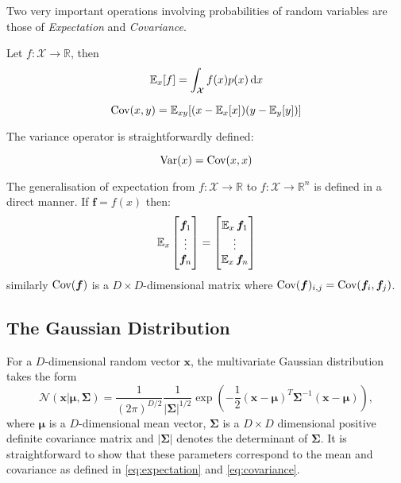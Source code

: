 Two very important operations involving probabilities of random variables are
those of \textit{Expectation} and \textit{Covariance}.
\begin{definition}[Expectation]
  \label{eq:expectation}
  Let $f : \mathcal{X} \to \mathbb{R}$, then
  \begin{equation*}
    \E_x[f] = \int_{\mathcal{X}} f(x) p(x) \dif x
  \end{equation*}
\end{definition}
\begin{definition}[Covariance]
  \label{eq:covariance}
  \begin{equation*}
    \operatorname{\textnormal{Cov}}(x, y) = \operatorname{\mathbb{E}}_{xy}[(x - \operatorname{\mathbb{E}}_x[x])(y - \operatorname{\mathbb{E}}_y[y])]
  \end{equation*}
\end{definition}
The variance operator is straightforwardly defined:
\begin{definition}[Variance]
  \label{eq:variance}
  \begin{equation*}
    \operatorname{\textnormal{Var}}(x) = \operatorname{\textnormal{Cov}}(x, x)
  \end{equation*}
\end{definition}

The generalisation of expectation from $f: \mathcal{X} \to \mathbb{R}$ to $f: \mathcal{X} \to
\mathbb{R}^n$ is defined in a direct manner. If $\bm{f} =
f(x)$ then:
\begin{equation*}
  \operatorname{\mathbb{E}}_x
  \begin{bmatrix}
    \bm{f}_1 \\
    \vdots \\
    \bm{f}_n \\
  \end{bmatrix} =
  \begin{bmatrix}
    \operatorname{\mathbb{E}}_x \bm{f}_1 \\
    \vdots \\
    \operatorname{\mathbb{E}}_x \bm{f}_n \\
  \end{bmatrix}
\end{equation*}
similarly $\operatorname{\textnormal{Cov}}(\bm{f})$ is a $D \times D$-dimensional matrix where
$\operatorname{\textnormal{Cov}}(\bm{f})_{i,j} = \operatorname{\textnormal{Cov}}(\bm{f}_i,
\bm{f}_j)$\cite{Bishop:2006, Barber:2012:BRM:2207809}.

\subsection{The Gaussian Distribution}
For a $D$-dimensional random vector $\bm{x}$, the multivariate Gaussian
distribution takes the form
\begin{equation}
  \label{eq:Gaussian_dist}
  \mathcal{N}(\bm{x} | \bm{\mu}, \bm{\Sigma}) = \frac{1}{(2\pi)^{D/2}}\frac{1}{|\bm{\Sigma}|^{1/2}}\exp\left( -\frac{1}{2}(\bm{x} - \bm{\mu})^T\bm{\Sigma}^{-1}(\bm{x} - \bm{\mu})\right),
\end{equation}
where $\bm{\mu}$ is a $D$-dimensional mean vector, $\bm{\Sigma}$ is a $D \times
D$ dimensional positive definite covariance matrix and $|\bm{\Sigma}|$ denotes
the determinant of $\bm{\Sigma}$. It is straightforward to show that these
parameters correspond to the mean and covariance as defined in
\ref{eq:expectation} and \ref{eq:covariance}\cite{Barber:2012:BRM:2207809}.

